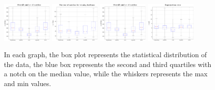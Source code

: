 \begin{figure}
  \centering
  \includegraphics[width=0.22\textwidth]{./figs/kframeSelection/matching.pdf}\hspace{2.5mm}
  \includegraphics[width=0.22\textwidth]{./figs/kframeSelection/matcheswinningKF.pdf}\hspace{2.5mm}
  \includegraphics[width=0.22\textwidth]{./figs/kframeSelection/matching.pdf}\hspace{2.5mm}
  \includegraphics[width=0.22\textwidth]{./figs/kframeSelection/rmsePnP.pdf}
\caption{In each graph, the box plot represents the statistical distribution of the data, the blue box represents the second and third quartiles with a notch on the median value, while the whiskers represents the max and min values.}
\label{fig:statsKframeSelection}
\end{figure}

